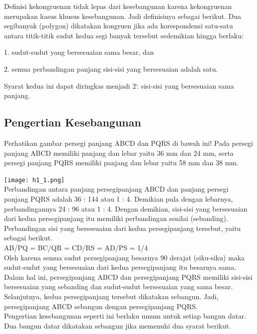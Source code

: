 \documentclass[11pt,fleqn]{book} %
\begin{document}
Definisi kekongruenan tidak lepas dari kesebangunan karena kekongruenan
merupakan kasus khusus kesebangunan. Jadi definisinya sebagai berikut.
Dua segibanyak (polygon) dikatakan kongruen jika ada korespondensi satu-satu
antara titik-titik sudut kedua segi banyak tersebut sedemikian hingga berlaku: 

1. sudut-sudut yang bersesuaian sama besar, dan

2. semua perbandingan panjang sisi-sisi yang bersesuaian adalah satu.

Syarat kedua ini dapat diringkas menjadi 2`. sisi-sisi yang bersesuaian sama panjang. 


\subsection{Pengertian Kesebangunan}

Perhatikan gambar persegi panjang ABCD dan PQRS di bawah ini! Pada persegi panjang ABCD memiliki panjang dan lebar yaitu 36 mm dan 24 mm, serta persegi panjang PQRS memiliki panjang dan lebar yaitu 58 mm dan 38 mm.

 \texttt{[image: h1\_1.png]}\\
 
Perbandingan antara panjang persegipanjang ABCD dan panjang persegi panjang PQRS adalah 36 : 144 atau 1 : 4. Demikian pula dengan lebarnya, perbandingannya 24 : 96 atau 1 : 4. Dengan demikian, sisi-sisi yang bersesuaian dari kedua persegipanjang itu memiliki perbandingan senilai (sebanding). Perbandingan sisi yang bersesuaian dari kedua persegipanjang tersebut, yaitu sebagai berikut.\\
AB/PQ = BC/QR = CD/RS = AD/PS = 1/4\\

Oleh karena semua sudut persegipanjang besarnya 90 derajat (siku-siku) maka sudut-sudut yang bersesuaian dari kedua persegipanjang itu besarnya sama. Dalam hal ini, persegipanjang ABCD dan persegipanjang PQRS memiliki sisi-sisi bersesuaian yang sebanding dan sudut-sudut bersesuaian yang sama besar. Selanjutnya, kedua persegipanjang tersebut dikatakan sebangun. Jadi, persegipanjang ABCD sebangun dengan persegipanjang PQRS.\\

Pengertian kesebangunan seperti ini berlaku umum untuk setiap bangun datar. Dua bangun datar dikatakan sebangun jika memenuhi dua syarat berikut.\\
\end{document}
